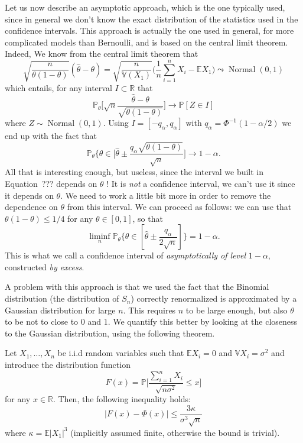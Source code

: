 \documentclass[
	fontsize=11pt, %
	twoside=false, %
	numbers=noenddot, %
]{kaobook}
\DeclareMathOperator{\nor}{Normal}
\renewcommand{\P}{\mathbb P}
\newcommand{\E}{\mathbb E}
\newcommand{\R}{\mathbb R}
\newcommand{\var}{\mathbb V}
\newcommand{\wh}{\widehat}
\begin{document}
Let us now describe an asymptotic approach, which is the one typically used, since in general we don't know the exact distribution of the statistics used in the confidence intervals.
This approach is actually the one used in general, for more complicated models than Bernoulli, and is based on the central limit theorem.
Indeed, We know from the central limit theorem that
\begin{equation*}
	\sqrt{ \frac{n}{\theta(1 - \theta)}} (\wh \theta - \theta) =  \sqrt{\frac{n}{\var(X_1)}} \Big( \frac 1n \sum_{i=1}^n X_i - \E X_1 \Big) \leadsto \nor(0, 1)
\end{equation*}
which entails, for any interval $I \subset \R$ that
\begin{equation*}
	\P_\theta\Big[ \sqrt n \frac{\wh \theta - \theta}{\sqrt{\theta(1 - \theta)}} 
	\Big] \rightarrow \P[Z \in I]
\end{equation*}
where $Z \sim \nor(0, 1)$.
Using $I = [-q_\alpha, q_\alpha]$ with $q_\alpha = \Phi^{-1}(1 - \alpha / 2)$ we end up with the fact that
\begin{equation*}
	\P_\theta\Big\{ \theta \in \Big[ \wh \theta \pm \frac{q_\alpha \sqrt{\theta(1 - \theta)}}{\sqrt n} \Big] \rightarrow 1 - \alpha.
\end{equation*}
All that is interesting enough, but useless, since the interval we built in Equation~??? depends on $\theta$ ! It is \emph{not} a confidence interval, we can't use it since it depends on $\theta$.
We need to work a little bit more in order to remove the dependence on $\theta$ from this interval. 
We can proceed as follows: we can use that $\theta (1 - \theta) \leq 1 / 4$ for any $\theta \in [0, 1]$, so that
\begin{equation*}
	\liminf_n \P_\theta\{ \theta \in [\wh \theta \pm \frac{q_\alpha}{2 \sqrt n} ] \} = 1 - \alpha.
\end{equation*}
This is what we call a confidence interval of \emph{asymptotically of level} $1 - \alpha$, constructed \emph{by excess}.

A problem with this approach is that we used the fact that the Binomial distribution (the distribution of $S_n$) correctly renormalized is approximated by a Gaussian distribution for large $n$.
This requires $n$ to be large enough, but also $\theta$ to be not to close to $0$ and $1$.
We quantify this better by looking at the closeness to the Gaussian distribution, using the following theorem.
\begin{theorem}
	Let $X_1, \ldots, X_n$ be i.i.d random variables such that $\E X_i = 0$ and $\var X_i = \sigma^2$ and introduce the distribution function
	\begin{equation*}
		F(x) = \P \Big[ \frac{\sum_{i=1}^n X_i}{\sqrt{n \sigma^2}} \leq x \Big]
	\end{equation*}
	for any $x \in \R$. Then, the following inequality holds:
	\begin{equation*}
		|F(x) - \Phi(x)| \leq \frac{3 \kappa}{\sigma^3 \sqrt n}
	\end{equation*}
	where $\kappa = \E |X_1|^3$ (implicitly assumed finite, otherwise the bound is trivial).
\end{theorem}
\end{document}
